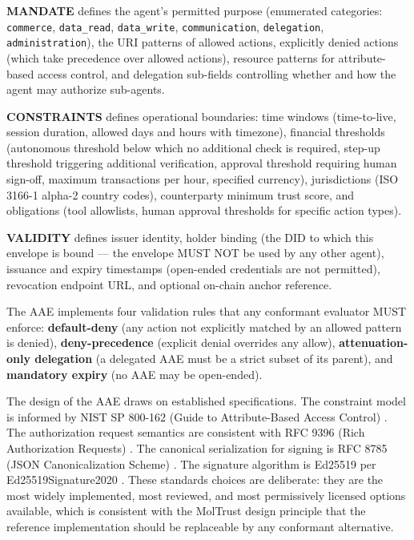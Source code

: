 \textbf{MANDATE} defines the agent's permitted purpose (enumerated categories: \texttt{commerce}, \texttt{data\_read}, \texttt{data\_write}, \texttt{communication}, \texttt{delegation}, \texttt{administration}), the URI patterns of allowed actions, explicitly denied actions (which take precedence over allowed actions), resource patterns for attribute-based access control, and delegation sub-fields controlling whether and how the agent may authorize sub-agents.


\textbf{CONSTRAINTS} defines operational boundaries: time windows (time-to-live, session duration, allowed days and hours with timezone), financial thresholds (autonomous threshold below which no additional check is required, step-up threshold triggering additional verification, approval threshold requiring human sign-off, maximum transactions per hour, specified currency), jurisdictions (ISO 3166-1 alpha-2 country codes), counterparty minimum trust score, and obligations (tool allowlists, human approval thresholds for specific action types).


\textbf{VALIDITY} defines issuer identity, holder binding (the DID to which this envelope is bound — the envelope MUST NOT be used by any other agent), issuance and expiry timestamps (open-ended credentials are not permitted), revocation endpoint URL, and optional on-chain anchor reference.


The AAE implements four validation rules that any conformant evaluator MUST enforce: \textbf{default-deny} (any action not explicitly matched by an allowed pattern is denied), \textbf{deny-precedence} (explicit denial overrides any allow), \textbf{attenuation-only delegation} (a delegated AAE must be a strict subset of its parent), and \textbf{mandatory expiry} (no AAE may be open-ended).


The design of the AAE draws on established specifications. The constraint model is informed by NIST SP 800-162 (Guide to Attribute-Based Access Control) \cite{ref29_abac}. The authorization request semantics are consistent with RFC 9396 (Rich Authorization Requests) \cite{ref30_rar}. The canonical serialization for signing is RFC 8785 (JSON Canonicalization Scheme) \cite{ref31_jcs}. The signature algorithm is Ed25519 per Ed25519Signature2020 \cite{ref32_ed25519}. These standards choices are deliberate: they are the most widely implemented, most reviewed, and most permissively licensed options available, which is consistent with the MolTrust design principle that the reference implementation should be replaceable by any conformant alternative.


